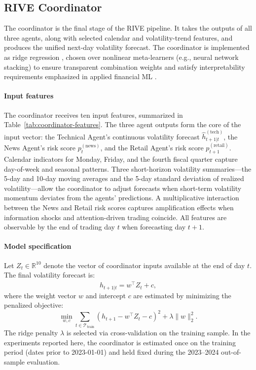 \documentclass[review]{elsarticle}
\begin{document}
\subsection{RIVE Coordinator}\label{rive-coordinator}

The coordinator is the final stage of the RIVE pipeline. It takes the outputs of all three agents, along with selected calendar and volatility-trend features, and produces the unified next-day volatility forecast. The coordinator is implemented as ridge regression \cite{hoerl1970}, chosen over nonlinear meta-learners (e.g., neural network stacking) to ensure transparent combination weights \cite{ramos2019} and satisfy interpretability requirements emphasized in applied financial ML \cite{celik2022}.

\paragraph{Input features}
The coordinator receives ten input features, summarized in Table~\ref{tab:coordinator-features}. The three agent outputs form the core of the input vector: the Technical Agent's continuous volatility forecast $\widehat{h}_{t+1|t}^{(\text{tech})}$, the News Agent's risk score $p_{t}^{(\text{news})}$, and the Retail Agent's risk score $p_{t+1}^{(\text{retail})}$. Calendar indicators for Monday, Friday, and the fourth fiscal quarter capture day-of-week and seasonal patterns. Three short-horizon volatility summaries---the 5-day and 10-day moving averages and the 5-day standard deviation of realized volatility---allow the coordinator to adjust forecasts when short-term volatility momentum deviates from the agents' predictions. A multiplicative interaction between the News and Retail risk scores captures amplification effects when information shocks and attention-driven trading coincide. All features are observable by the end of trading day $t$ when forecasting day $t{+}1$.

\paragraph{Model specification}
Let $Z_t \in \mathbb{R}^{10}$ denote the vector of coordinator inputs available at the end of day $t$. The final volatility forecast is:
\begin{equation}\label{eq:coordinator}
\widehat{h}_{t+1|t} = w^{\top} Z_t + c,
\end{equation}
where the weight vector $w$ and intercept $c$ are estimated by minimizing the penalized objective:
\[
\min_{w,c} \sum_{t \in \mathcal{T}_{\text{train}}} \left(h_{t+1} - w^{\top}Z_t - c\right)^2 + \lambda \|w\|_2^2.
\]
The ridge penalty $\lambda$ is selected via cross-validation on the training sample. In the experiments reported here, the coordinator is estimated once on the training period (dates prior to 2023-01-01) and held fixed during the 2023--2024 out-of-sample evaluation. %
\end{document}
